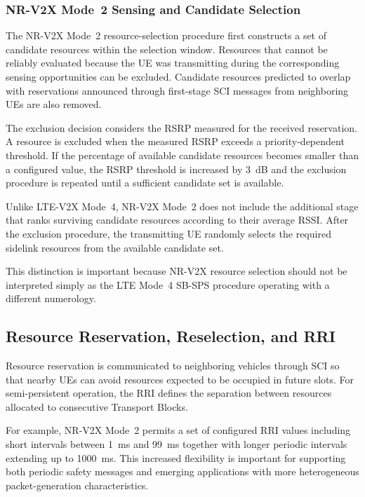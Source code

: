 \subsubsection{NR-V2X Mode~2 Sensing and Candidate Selection}

The NR-V2X Mode~2 resource-selection procedure first constructs a set of
candidate resources within the selection window. Resources that cannot be
reliably evaluated because the UE was transmitting during the corresponding
sensing opportunities can be excluded. Candidate resources predicted to
overlap with reservations announced through first-stage SCI messages from
neighboring UEs are also removed.

The exclusion decision considers the RSRP measured for the received
reservation. A resource is excluded when the measured RSRP exceeds a
priority-dependent threshold. If the percentage of available candidate
resources becomes smaller than a configured value, the RSRP threshold is
increased by 3~dB and the exclusion procedure is repeated until a sufficient
candidate set is available.

Unlike LTE-V2X Mode~4, NR-V2X Mode~2 does not include the additional stage
that ranks surviving candidate resources according to their average RSSI.
After the exclusion procedure, the transmitting UE randomly selects the
required sidelink resources from the available candidate set.

This distinction is important because NR-V2X resource selection should not
be interpreted simply as the LTE Mode~4 SB-SPS procedure operating with a
different numerology.

\subsection{Resource Reservation, Reselection, and RRI}

Resource reservation is communicated to neighboring vehicles through SCI so
that nearby UEs can avoid resources expected to be occupied in future slots.
For semi-persistent operation, the RRI defines the separation between
resources allocated to consecutive Transport Blocks.

For example, NR-V2X Mode~2 permits a set of configured RRI values including
short intervals between 1~ms and 99~ms together with longer periodic
intervals extending up to 1000~ms. This increased flexibility is important
for supporting both periodic safety messages and emerging applications with
more heterogeneous packet-generation characteristics.

